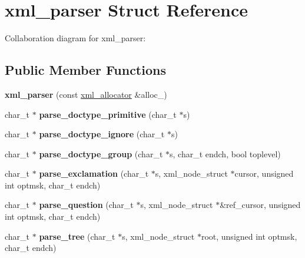 \hypertarget{structxml__parser}{}\section{xml\+\_\+parser Struct Reference}
\label{structxml__parser}


Collaboration diagram for xml\+\_\+parser\+:
\subsection*{Public Member Functions}
\begin{DoxyCompactItemize}
\item 
\hypertarget{structxml__parser_acc030c4ed339b238e1ff2d3e6fa7188b}{}{\bfseries xml\+\_\+parser} (const \hyperlink{structxml__allocator}{xml\+\_\+allocator} \&alloc\+\_\+)\label{structxml__parser_acc030c4ed339b238e1ff2d3e6fa7188b}

\item 
\hypertarget{structxml__parser_a722853b603ad9a1d1f61bb8115bea5b4}{}char\+\_\+t $\ast$ {\bfseries parse\+\_\+doctype\+\_\+primitive} (char\+\_\+t $\ast$s)\label{structxml__parser_a722853b603ad9a1d1f61bb8115bea5b4}

\item 
\hypertarget{structxml__parser_a1e996ac9c9993f1939128859596376a1}{}char\+\_\+t $\ast$ {\bfseries parse\+\_\+doctype\+\_\+ignore} (char\+\_\+t $\ast$s)\label{structxml__parser_a1e996ac9c9993f1939128859596376a1}

\item 
\hypertarget{structxml__parser_a9bc0e5f3d75cd7edb267a85430e1cdfc}{}char\+\_\+t $\ast$ {\bfseries parse\+\_\+doctype\+\_\+group} (char\+\_\+t $\ast$s, char\+\_\+t endch, bool toplevel)\label{structxml__parser_a9bc0e5f3d75cd7edb267a85430e1cdfc}

\item 
\hypertarget{structxml__parser_a40da52e4b27a0a06752930a0edf16fe9}{}char\+\_\+t $\ast$ {\bfseries parse\+\_\+exclamation} (char\+\_\+t $\ast$s, xml\+\_\+node\+\_\+struct $\ast$cursor, unsigned int optmsk, char\+\_\+t endch)\label{structxml__parser_a40da52e4b27a0a06752930a0edf16fe9}

\item 
\hypertarget{structxml__parser_a2b0edc4fbf2ff448b4d5b31593c5c4fd}{}char\+\_\+t $\ast$ {\bfseries parse\+\_\+question} (char\+\_\+t $\ast$s, xml\+\_\+node\+\_\+struct $\ast$\&ref\+\_\+cursor, unsigned int optmsk, char\+\_\+t endch)\label{structxml__parser_a2b0edc4fbf2ff448b4d5b31593c5c4fd}

\item 
\hypertarget{structxml__parser_a96e76ebea8834b3e56e1c8646e593da4}{}char\+\_\+t $\ast$ {\bfseries parse\+\_\+tree} (char\+\_\+t $\ast$s, xml\+\_\+node\+\_\+struct $\ast$root, unsigned int optmsk, char\+\_\+t endch)\label{structxml__parser_a96e76ebea8834b3e56e1c8646e593da4}

\end{DoxyCompactItemize}
